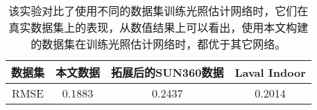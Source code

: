 \begin{table}[htbp]
    \centering
    \caption[与现有数据集对比]{
        \label{table:eval-data-previous}
        该实验对比了使用不同的数据集训练光照估计网络时，它们在真实数据集上的表现，从数值结果上可以看出，使用本文构建的数据集在训练光照估计网络时，都优于其它网络。
    }
    \begin{tabular}{c|c|c|c}
        \toprule
    数据集& 本文数据  & 拓展后的SUN360数据 & Laval Indoor\\ \hline
    RMSE &  0.1883 & 0.2437 & 0.2014 \\
        \bottomrule
    \end{tabular}
\end{table}